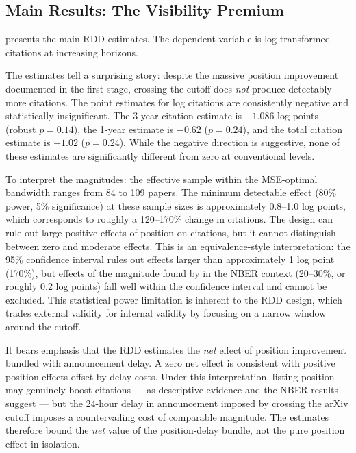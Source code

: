 \documentclass[12pt]{article}
\begin{document}


\subsection{Main Results: The Visibility Premium}

 presents the main RDD estimates. The dependent variable is log-transformed citations at increasing horizons.



The estimates tell a surprising story: despite the massive position improvement documented in the first stage, crossing the cutoff does \textit{not} produce detectably more citations. The point estimates for log citations are consistently negative and statistically insignificant. The 3-year citation estimate is $-1.086$ log points (robust $p = 0.14$), the 1-year estimate is $-0.62$ ($p = 0.24$), and the total citation estimate is $-1.02$ ($p = 0.24$). While the negative direction is suggestive, none of these estimates are significantly different from zero at conventional levels.

To interpret the magnitudes: the effective sample within the MSE-optimal bandwidth ranges from 84 to 109 papers. The minimum detectable effect (80\% power, 5\% significance) at these sample sizes is approximately 0.8--1.0 log points, which corresponds to roughly a 120--170\% change in citations. The design can rule out large positive effects of position on citations, but it cannot distinguish between zero and moderate effects. This is an equivalence-style interpretation: the 95\% confidence interval rules out effects larger than approximately 1 log point (170\%), but effects of the magnitude found by \citet{feenberg2017} in the NBER context (20--30\%, or roughly 0.2 log points) fall well within the confidence interval and cannot be excluded. This statistical power limitation is inherent to the RDD design, which trades external validity for internal validity by focusing on a narrow window around the cutoff.

It bears emphasis that the RDD estimates the \textit{net} effect of position improvement bundled with announcement delay. A zero net effect is consistent with positive position effects offset by delay costs. Under this interpretation, listing position may genuinely boost citations --- as descriptive evidence and the NBER results suggest --- but the 24-hour delay in announcement imposed by crossing the arXiv cutoff imposes a countervailing cost of comparable magnitude. The estimates therefore bound the \textit{net} value of the position-delay bundle, not the pure position effect in isolation.
\end{document}

